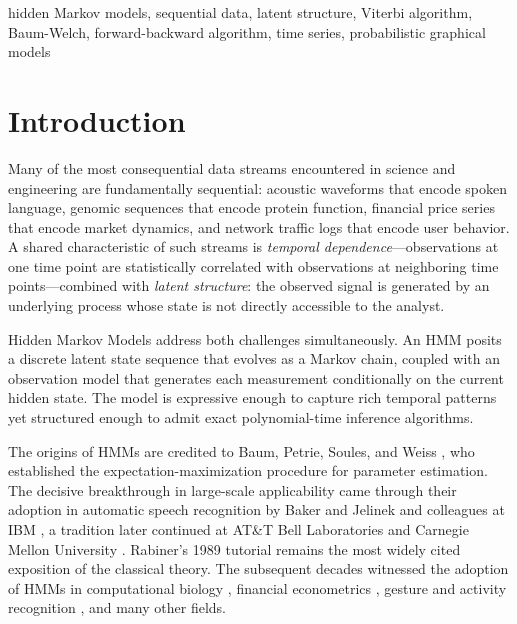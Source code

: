 \documentclass[conference]{IEEEtran}
\begin{document}
\begin{IEEEkeywords}
hidden Markov models, sequential data, latent structure, Viterbi algorithm, Baum-Welch, forward-backward algorithm, time series, probabilistic graphical models
\end{IEEEkeywords}

\section{Introduction}

Many of the most consequential data streams encountered in science and engineering are fundamentally sequential: acoustic waveforms that encode spoken language, genomic sequences that encode protein function, financial price series that encode market dynamics, and network traffic logs that encode user behavior. A shared characteristic of such streams is \emph{temporal dependence}---observations at one time point are statistically correlated with observations at neighboring time points---combined with \emph{latent structure}: the observed signal is generated by an underlying process whose state is not directly accessible to the analyst.

Hidden Markov Models address both challenges simultaneously. An HMM posits a discrete latent state sequence that evolves as a Markov chain, coupled with an observation model that generates each measurement conditionally on the current hidden state. The model is expressive enough to capture rich temporal patterns yet structured enough to admit exact polynomial-time inference algorithms.

The origins of HMMs are credited to Baum, Petrie, Soules, and Weiss \cite{baum1970maximization}, who established the expectation-maximization procedure for parameter estimation. The decisive breakthrough in large-scale applicability came through their adoption in automatic speech recognition by Baker \cite{baker1975dragon} and Jelinek and colleagues at IBM \cite{jelinek1976continuous}, a tradition later continued at AT\&T Bell Laboratories and Carnegie Mellon University \cite{rabiner1989tutorial}. Rabiner's 1989 tutorial \cite{rabiner1989tutorial} remains the most widely cited exposition of the classical theory. The subsequent decades witnessed the adoption of HMMs in computational biology \cite{krogh1994hidden}, financial econometrics \cite{hamilton1989new}, gesture and activity recognition \cite{yamato1992recognizing}, and many other fields.
\end{document}
